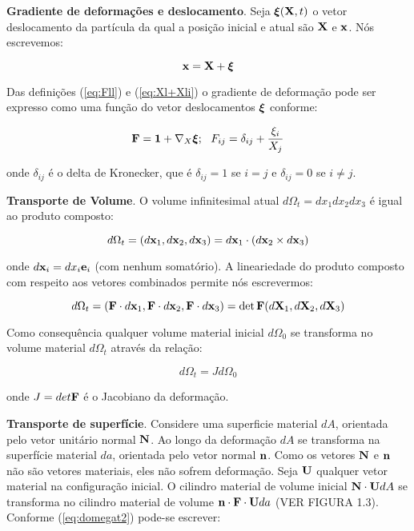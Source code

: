 \documentclass[
	11pt, %
	fleqn, %
	a4paper, %
]{LegrandOrangeBook}
\begin{document}
\textbf{Gradiente de deformações e deslocamento}. Seja $\bm{\xi}(\textbf{X},t)$ o vetor deslocamento da partícula da qual a posição inicial e atual são $\textbf{X}$ e $\textbf{x}$. Nós escrevemos:

\begin{equation}
	\label{eq:Xl+Xli}	
	\textbf{x} = \textbf{X} + \bm{\xi}
\end{equation}

Das definições (\ref{eq:Fll}) e (\ref{eq:Xl+Xli}) o gradiente de deformação pode ser expresso como uma função do vetor deslocamentos $\bm{\xi}$ conforme:

\begin{equation}
	\label{eq:Fll=1+nablaXil}	
	\textbf{F} = \bm{1} + \nabla_X \bm{\xi}; ~~ F_{ij} = \delta_{ij}+\dfrac{\xi_i}{X_j}
\end{equation}	

onde $\delta_{ij}$ é o delta de Kronecker, que é $\delta_{ij}=1$ se $i=j$ e $\delta_{ij}=0$ se $i \neq j$.

\textbf{Transporte de Volume}. O volume infinitesimal atual $d\Omega_t=dx_1 dx_2 dx_3$ é igual ao produto composto:

\begin{equation}
	\label{eq:domegat}	
	d\Omega_t = (d\textbf{x}_1, d\textbf{x}_2, d\textbf{x}_3) = d\textbf{x}_1 \cdot (d\textbf{x}_2 \times d\textbf{x}_3)
\end{equation}	

onde $d\textbf{x}_i=dx_i\textbf{e}_i$ (com nenhum somatório). A lineariedade do produto composto com respeito aos vetores combinados permite nós escrevermos:

\begin{equation}
	\label{eq:domegat2}	
	d\Omega_t = (\textbf{F} \cdot d\textbf{x}_1, \textbf{F} \cdot d\textbf{x}_2, \textbf{F} \cdot d\textbf{x}_3) = \det \textbf{F}(d\textbf{X}_1, d\textbf{X}_2, d\textbf{X}_3)
\end{equation}

Como consequência qualquer volume material inicial $d\Omega_0$ se transforma no volume material $d\Omega_t$ através da relação:

\begin{equation}
	\label{eq:domegat2}	
	d\Omega_t = Jd\Omega_0
\end{equation}

onde $J=det{\textbf{F}}$ é o Jacobiano da deformação.

\textbf{Transporte de superfície}. Considere uma superficie material $dA$, orientada pelo vetor unitário normal $\textbf{N}$. Ao longo da deformação $dA$ se transforma na superfície material $da$, orientada pelo vetor normal $\textbf{n}$. Como os vetores $\textbf{N}$ e $\textbf{n}$ não são vetores materiais, eles não sofrem deformação. Seja $\textbf{U}$ qualquer vetor material na configuração inicial. O cilindro material de volume inicial $\textbf{N} \cdot \textbf{U} dA$ se transforma no cilindro material de volume $\textbf{n} \cdot \textbf{F} \cdot \textbf{U} da$ (VER FIGURA 1.3). Conforme (\ref{eq:domegat2}) pode-se escrever:
\end{document}
